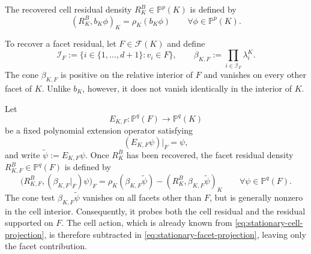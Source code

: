The recovered cell residual density \(R_K^B\in\mathbb P^p(K)\) is defined by
\begin{equation}
  (R_K^B,b_K\phi)_K
  =
  \rho_K(b_K\phi)
  \qquad
  \forall\phi\in\mathbb P^p(K).
  \label{eq:stationary-cell-projection}
\end{equation}

To recover a facet residual, let \(F\in\mathcal F(K)\) and define
\begin{equation}
  \mathcal I_F
  :=
  \{i\in\{1,\ldots,d+1\}:v_i\in F\},
  \qquad
  \beta_{K,F}
  :=
  \prod_{i\in\mathcal I_F}\lambda_i^K.
  \label{eq:recovery-facet-cone}
\end{equation}
The cone \(\beta_{K,F}\) is positive on the relative interior of \(F\) and vanishes on every other facet of \(K\). Unlike \(b_K\), however, it does not vanish identically in the interior of \(K\).

Let
\begin{equation}
  E_{K,F}:\mathbb P^q(F)\longrightarrow\mathbb P^q(K)
  \label{eq:facet-polynomial-extension}
\end{equation}
be a fixed polynomial extension operator satisfying
\[
  (E_{K,F}\psi)|_F=\psi,
\]
and write \(\widetilde\psi:=E_{K,F}\psi\). Once \(R_K^B\) has been recovered, the facet residual density \(R_{K,F}^B\in\mathbb P^q(F)\) is defined by
\begin{equation}
  \bigl(R_{K,F}^B,(\beta_{K,F}|_F)\psi\bigr)_F
  =
  \rho_K(\beta_{K,F}\widetilde\psi)
  -
  (R_K^B,\beta_{K,F}\widetilde\psi)_K
  \qquad
  \forall\psi\in\mathbb P^q(F).
  \label{eq:stationary-facet-projection}
\end{equation}
The cone test \(\beta_{K,F}\widetilde\psi\) vanishes on all facets other than \(F\), but is generally nonzero in the cell interior. Consequently, it probes both the cell residual and the residual supported on \(F\). The cell action, which is already known from \cref{eq:stationary-cell-projection}, is therefore subtracted in \cref{eq:stationary-facet-projection}, leaving only the facet contribution.


